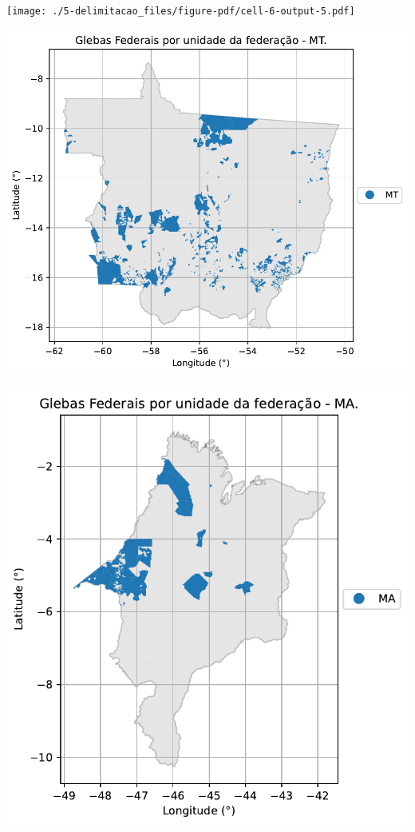 \documentclass[
  letterpaper,
]{report}
\begin{document}
\texttt{[image: ./5-delimitacao\_files/figure-pdf/cell-6-output-5.pdf]}

\includegraphics{./5-delimitacao_files/figure-pdf/cell-6-output-6.pdf}

\includegraphics{./5-delimitacao_files/figure-pdf/cell-6-output-7.pdf}
\end{document}
